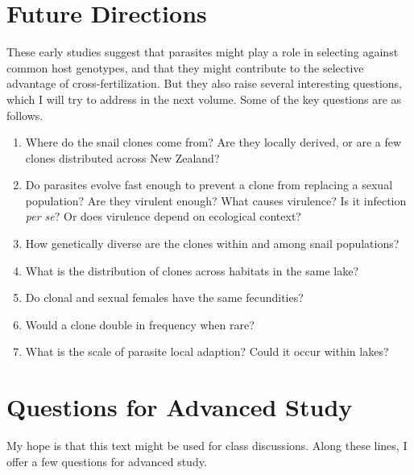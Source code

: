 \documentclass[
  letterpaper,
]{book}
\providecommand{\tightlist}{%
  \setlength{\itemsep}{0pt}\setlength{\parskip}{0pt}}\usepackage{longtable,booktabs,array}
\begin{document}
\section{Future Directions}\label{future-directions}

These early studies suggest that parasites might play a role in
selecting against common host genotypes, and that they might contribute
to the selective advantage of cross-fertilization. But they also raise
several interesting questions, which I will try to address in the next
volume. Some of the key questions are as follows.

\begin{enumerate}
\def\labelenumi{\arabic{enumi}.}
\tightlist
\item
  Where do the snail clones come from? Are they locally derived, or are
  a few clones distributed across New Zealand?
\item
  Do parasites evolve fast enough to prevent a clone from replacing a
  sexual population? Are they virulent enough? What causes virulence? Is
  it infection \emph{per se}? Or does virulence depend on ecological
  context?
\item
  How genetically diverse are the clones within and among snail
  populations?
\item
  What is the distribution of clones across habitats in the same lake?
\item
  Do clonal and sexual females have the same fecundities?
\item
  Would a clone double in frequency when rare?
\item
  What is the scale of parasite local adaption? Could it occur within
  lakes?
\end{enumerate}

\section{Questions for Advanced
Study}\label{questions-for-advanced-study}

My hope is that this text might be used for class discussions. Along
these lines, I offer a few questions for advanced study.
\end{document}
